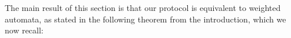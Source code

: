 





The main result of this section is that our protocol is equivalent to weighted automata, as stated in the following theorem from the introduction, which we now recall:
\fielddomain*

